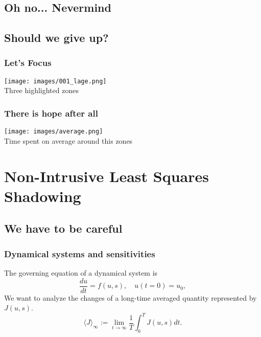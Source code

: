 \documentclass{beamer}
\begin{document}
  \subsection{Oh no... Nevermind}


  \subsection{Should we give up?}
  \begin{frame}
    \frametitle{Let's Focus}
    \begin{center}
    \texttt{[image: images/001\_lage.png]}\\
    \tiny{Three highlighted zones}
  \end{center}
  \end{frame}

\begin{frame}
  \frametitle{There is hope after all}
  \begin{center}
  \texttt{[image: images/average.png]}\\
  \tiny{Time spent on average around this zones}
\end{center}
\end{frame}


\section{Non-Intrusive Least Squares Shadowing}
\subsection{We have to be careful}
\begin{frame}
  \frametitle{Dynamical systems and sensitivities}
  The governing equation of a dynamical system is
  \begin{equation}
    \frac{du}{dt} = f(u,s), \quad{u(t=0)=u_0},
  \end{equation}
  We want to analyze the changes of a long-time averaged quantity represented by $J(u,s)$.
  \begin{equation}
    \langle J \rangle_\infty := \lim_{t\rightarrow \infty} \frac{1}{T}\int_0^T J(u,s)dt.
  \end{equation}
\end{frame}
\end{document}
